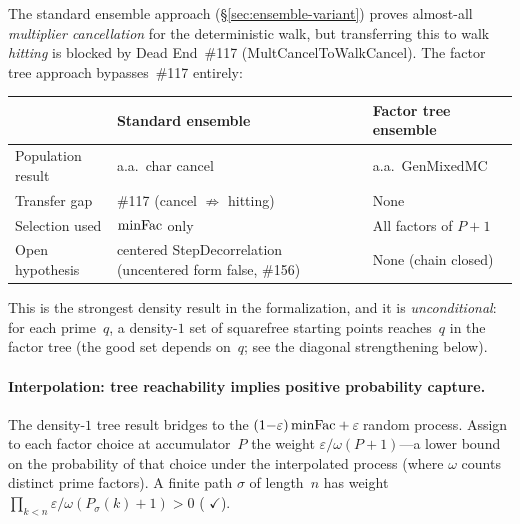 \begin{deadend}[title={Dead End \#117: MultCancelToWalkCancel}]
The standard ensemble approach
(\S\ref{sec:ensemble-variant}) proves almost-all
\emph{multiplier cancellation} for the deterministic walk, but
transferring this to walk \emph{hitting} is blocked by
Dead End~\#117 (MultCancelToWalkCancel).  The factor tree approach
bypasses~\#117 entirely:
\smallskip
\begin{center}
\begin{tabular}{@{}l@{\quad}l@{\quad}l@{}}
\toprule
 & \textbf{Standard ensemble} & \textbf{Factor tree ensemble} \\
\midrule
Population result & a.a.\ char cancel & a.a.\ GenMixedMC \\
Transfer gap & \#117 (cancel $\not\Rightarrow$ hitting) & None \\
Selection used & $\mathrm{minFac}$ only & All factors of $P{+}1$ \\
Open hypothesis & centered StepDecorrelation (uncentered form false, \#156) & None (chain closed) \\
\bottomrule
\end{tabular}
\end{center}
\end{deadend}

\smallskip\noindent
This is the strongest density result in the formalization, and it is
\emph{unconditional}: for each prime~$q$, a density-$1$ set of
squarefree starting points reaches~$q$ in the factor tree (the good
set depends on~$q$; see the diagonal strengthening below).

\paragraph{Interpolation: tree reachability implies positive probability capture.}
The density-$1$ tree result bridges to the $(1{-}\varepsilon)\,\mathrm{minFac}
+ \varepsilon\,$random process.  Assign to each factor choice at
accumulator~$P$ the weight $\varepsilon / \omega(P{+}1)$---a lower
bound on the probability of that choice under the interpolated process
(where $\omega$ counts distinct prime factors).  A finite path
$\sigma$ of length~$n$ has weight
$\prod_{k<n} \varepsilon / \omega(P_\sigma(k){+}1) > 0$
(
{\color{leanink}$\checkmark$}).

